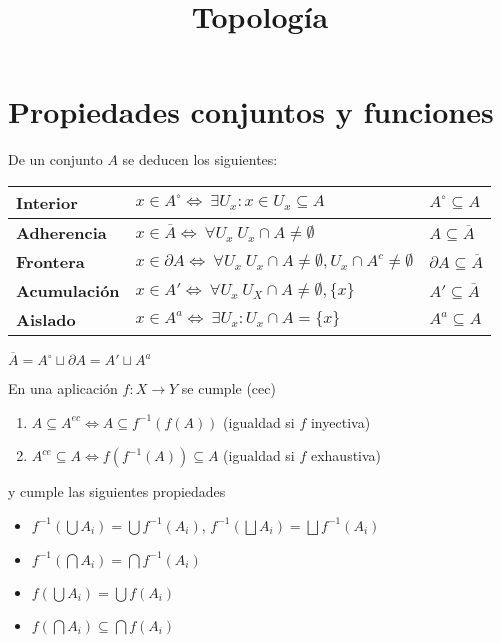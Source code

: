 \documentclass{myclass}
\title{Topología}
\begin{document}
\maketitle
\tableofcontents
\newpage

\section{Propiedades conjuntos y funciones}

De un conjunto $A$ se deducen los siguientes:

\begin{tabular}{|l|l|l|}
  \hline
  \textbf{Interior} & $x \in  A^\circ \iff \ \exists U_x : x \in  U_x \subseteq A $ & $A^\circ \subseteq A$ \\
  \hline
  \textbf{Adherencia} & $x\in \overline{A} \iff \ \forall U_x \ U_x\cap A \neq \emptyset $ & $A \subseteq \overline{A}$ \\
  \hline
  \textbf{Frontera} & $x\in \partial A \iff \ \forall U_x \ U_x \cap A \neq \emptyset , U_x\cap A^c\neq \emptyset$ & $\partial A \subseteq \overline{A}$ \\
  \hline
  \textbf{Acumulación} & $x \in  A' \iff \ \forall U_x \ U_X\cap A \neq \emptyset, \{x\}$ & $A'\subseteq \overline{A}$ \\
  \hline
  \textbf{Aislado} & $x\in A^a \iff \ \exists U_x : U_x \cap A = \{x\}$ & $A^a \subseteq  A$ \\
  \hline
\end{tabular}

$\overline{A} = A^\circ \sqcup \partial A = A' \sqcup A^a $

En una aplicación $f:X\to Y$ se cumple (cec)
\begin{enumerate}[topsep=-6pt, itemsep=0pt]
  \item $A\subseteq A^{ec} \iff A\subseteq f^{-1}(f(A))$ (igualdad si $f$ inyectiva)
  \item $A^{ce}\subseteq A \iff f(f^{-1}(A))\subseteq A$ (igualdad si $f$ exhaustiva)
\end{enumerate}
y cumple las siguientes propiedades
\begin{itemize}[topsep=-6pt, itemsep=0pt]
  \item $f^{-1}(\bigcup A_i)=\bigcup f^{-1}(A_i)$, $f^{-1}(\bigsqcup A_i)=\bigsqcup f^{-1}(A_i)$
  \item $f^{-1}(\bigcap A_i) = \bigcap f^{-1}(A_i)$
  \item $f(\bigcup A_i)=\bigcup f(A_i)$ 
  \item $f(\bigcap A_i) \subseteq \bigcap f(A_i)$
\end{itemize}
\end{document}
